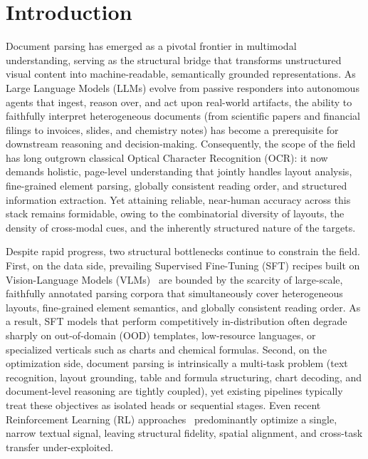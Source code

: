 \section{Introduction}

Document parsing has emerged as a pivotal frontier in multimodal understanding, serving as the structural bridge that transforms unstructured visual content into machine-readable, semantically grounded representations. As Large Language Models (LLMs) evolve from passive responders into autonomous agents that ingest, reason over, and act upon real-world artifacts, the ability to faithfully interpret heterogeneous documents (from scientific papers and financial filings to invoices, slides, and chemistry notes) has become a prerequisite for downstream reasoning and decision-making. Consequently, the scope of the field has long outgrown classical Optical Character Recognition (OCR): it now demands holistic, page-level understanding that jointly handles layout analysis, fine-grained element parsing, globally consistent reading order, and structured information extraction. Yet attaining reliable, near-human accuracy across this stack remains formidable, owing to the combinatorial diversity of layouts, the density of cross-modal cues, and the inherently structured nature of the targets.

Despite rapid progress, two structural bottlenecks continue to constrain the field. First, on the data side, prevailing Supervised Fine-Tuning (SFT) recipes built on Vision-Language Models (VLMs)~\cite{niu2025mineru2, cui2025paddleocr, wei2025deepseek} are bounded by the scarcity of large-scale, faithfully annotated parsing corpora that simultaneously cover heterogeneous layouts, fine-grained element semantics, and globally consistent reading order. As a result, SFT models that perform competitively in-distribution often degrade sharply on out-of-domain (OOD) templates, low-resource languages, or specialized verticals such as charts and chemical formulas. Second, on the optimization side, document parsing is intrinsically a multi-task problem (text recognition, layout grounding, table and formula structuring, chart decoding, and document-level reasoning are tightly coupled), yet existing pipelines typically treat these objectives as isolated heads or sequential stages. Even recent Reinforcement Learning (RL) approaches~\cite{wang2025infinity, chen2025logics, poznanski2025olmocr2} predominantly optimize a single, narrow textual signal, leaving structural fidelity, spatial alignment, and cross-task transfer under-exploited.

